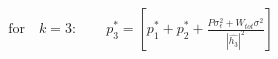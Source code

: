 \documentclass[preview]{standalone}
\begin{document}
\begin{align*}
\text{for} \quad k=3: \qquad p_3^\ast = \left[p_1^\ast + p_2^\ast + \frac{P \sigma_\epsilon^2 + W_{tot} \sigma^2}{\left|\hat{h_3}\right|^2}\right]
\end{align*}
\end{document}
